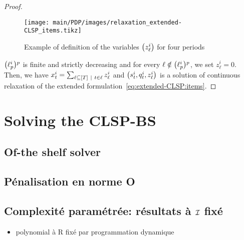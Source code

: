 \begin{proof}
\begin{figure}[h]
  \centering
  \texttt{[image: main/PDP/images/relaxation\_extended-CLSP\_items.tikz]}
  \caption{Example of definition of the variables $\bracket{z_{\ell}^i}$ for four periods}
  \label{fig:relaxation-extended-formulation-by-reference}
\end{figure}

$\bracket{\ell_p^i}^p$ is finite and strictly decreasing and for every $\ell\notin\bracket{\ell_p^i}^p$, we set $z_{\ell}^i=0$. Then, we have $\setup_t^i = \sum_{\ell\subseteq\range{\horizon}~|~t\in\ell} z_{\ell}^i$ and $\bracket{\inventory_t^i, \quantity_t^i, z_{\ell}^i}$ is a solution of continuous relaxation of the extended formulation~\eqref{eq:extended-CLSP:items}.
\end{proof}




\section{Solving the CLSP-BS}
\label{sec:PDP:deterministic:solving}

\subsection{Of-the shelf solver}


\subsection{Pénalisation en norme O}



\subsection{Complexité paramétrée: résultats à $\mathcal{I}$ fixé}


\begin{itemize}
  \item polynomial à R fixé par programmation dynamique
\end{itemize}
